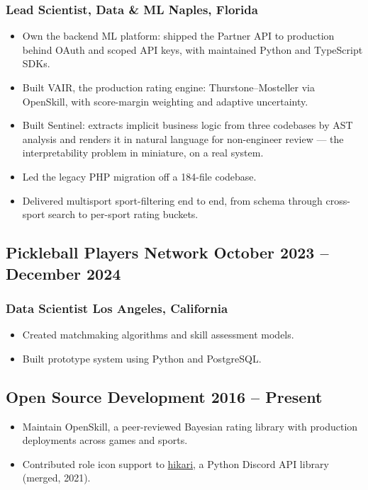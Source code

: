 \documentclass[11pt]{article}
\begin{document}
\subsubsection{Lead Scientist, Data \& ML \hspace*{\fill} Naples, Florida}
\begin{itemize}
    \item Own the backend ML platform: shipped the Partner API to production behind OAuth and scoped API keys, with maintained Python and TypeScript SDKs.
    \item Built VAIR, the production rating engine: Thurstone--Mosteller via OpenSkill, with score-margin weighting and adaptive uncertainty.
    \item Built Sentinel: extracts implicit business logic from three codebases by AST analysis and renders it in natural language for non-engineer review --- the interpretability problem in miniature, on a real system.
    \item Led the legacy PHP migration off a 184-file codebase.
    \item Delivered multisport sport-filtering end to end, from schema through cross-sport search to per-sport rating buckets.
\end{itemize}

\subsection{Pickleball Players Network \hspace*{\fill} October 2023 -- December 2024}
\subsubsection{Data Scientist \hspace*{\fill} Los Angeles, California}
\begin{itemize}
    \item Created matchmaking algorithms and skill assessment models.
    \item Built prototype system using Python and PostgreSQL.
\end{itemize}

\subsection{Open Source Development \hspace*{\fill} 2016 -- Present}
\begin{itemize}
    \item Maintain OpenSkill, a peer-reviewed Bayesian rating library with production deployments across games and sports.
    \item Contributed role icon support to \href{https://github.com/hikari-py/hikari/pull/838}{hikari}, a Python Discord API library (merged, 2021).
\end{itemize}
\end{document}
